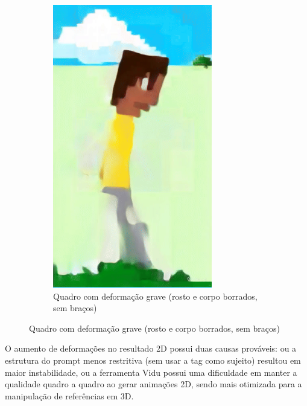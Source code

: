 \begin{figure}[htbp]
\begin{subfigure}{0.32\linewidth}
        \includegraphics[width=1\linewidth]{figs/vidu/3grave.png}
        \caption{\small Quadro com deformação grave (rosto e corpo borrados, sem braços)}
        \label{fig:viduDeformacao3Grave}
    \end{subfigure}
\end{figure}


O aumento de deformações no resultado 2D possui duas causas prováveis: ou a estrutura do prompt menos restritiva (sem usar a tag como sujeito) resultou em maior instabilidade, ou a ferramenta Vidu possui uma dificuldade em manter a qualidade quadro a quadro ao gerar animações 2D, sendo mais otimizada para a manipulação de referências em 3D.

